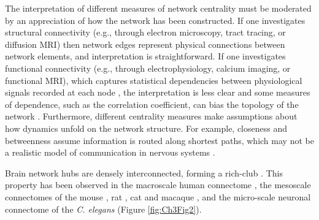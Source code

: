 The interpretation of different measures of network centrality must be moderated by an appreciation of how the network has been constructed. If one investigates structural connectivity (e.g., through electron microscopy, tract tracing, or diffusion MRI) then network edges represent physical connections between network elements, and interpretation is straightforward. If one investigates functional connectivity (e.g., through electrophysiology, calcium imaging, or functional MRI), which captures statistical dependencies between physiological signals recorded at each node \citep{Friston1994}, the interpretation is less clear and some measures of dependence, such as the correlation coefficient, can bias the topology of the network \citep{Power2011,Zalesky2012}. Furthermore, different centrality measures make assumptions about how dynamics unfold on the network structure. For example, closeness and betweenness assume information is routed along shortest paths, which may not be a realistic model of communication in nervous systems \citep{Goni2014,Misic2015a,Seguin2018}.

Brain network hubs are densely interconnected, forming a rich-club \citep{Colizza2006}. This property has been observed in the macroscale human connectome \citep{VandenHeuvel2011}, the mesoscale connectomes of the mouse \citep{Fulcher2016}, rat \citep{VandenHeuvel2016b}, cat \citep{DeReus2013b} and macaque \citep{Harriger2012}, and the micro-scale neuronal connectome of the \textit{C. elegans} \citep{Towlson2013} (Figure \ref{fig:Ch3Fig2}).

